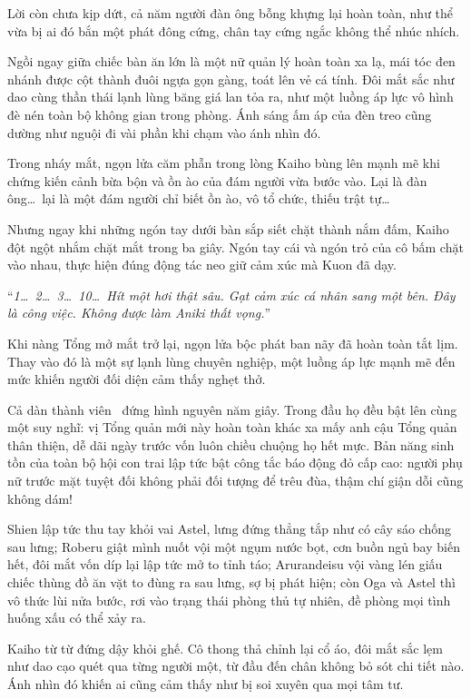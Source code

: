\documentclass[../main.tex]{subfiles}
\begin{document}
Lời còn chưa kịp dứt, cả năm người đàn ông bỗng khựng lại hoàn toàn, như thể vừa bị ai đó bắn một phát đông cứng, chân tay cứng ngắc không thể nhúc nhích.

Ngồi ngay giữa chiếc bàn ăn lớn là một nữ quản lý hoàn toàn xa lạ, mái tóc đen nhánh được cột thành đuôi ngựa gọn gàng, toát lên vẻ cá tính. Đôi mắt sắc như dao cùng thần thái lạnh lùng băng giá lan tỏa ra, như một luồng áp lực vô hình đè nén toàn bộ không gian trong phòng. Ánh sáng ấm áp của đèn treo cũng dường như nguội đi vài phần khi chạm vào ánh nhìn đó.

Trong nháy mắt, ngọn lửa căm phẫn trong lòng Kaiho bùng lên mạnh mẽ khi chứng kiến cảnh bừa bộn và ồn ào của đám người vừa bước vào. Lại là đàn ông\dots\ lại là một đám người chỉ biết ồn ào, vô tổ chức, thiếu trật tự\dots\

Nhưng ngay khi những ngón tay dưới bàn sắp siết chặt thành nắm đấm, Kaiho đột ngột nhắm chặt mắt trong ba giây. Ngón tay cái và ngón trỏ của cô bấm chặt vào nhau, thực hiện đúng động tác neo giữ cảm xúc mà Kuon đã dạy.

``\textit{1\dots\ 2\dots\ 3\dots\ 10\dots\ Hít một hơi thật sâu. Gạt cảm xúc cá nhân sang một bên. Đây là công việc. Không được làm Aniki thất vọng.}''

Khi nàng Tổng mở mắt trở lại, ngọn lửa bộc phát ban nãy đã hoàn toàn tắt lịm. Thay vào đó là một sự lạnh lùng chuyên nghiệp, một luồng áp lực mạnh mẽ đến mức khiến người đối diện cảm thấy nghẹt thở.

Cả dàn thành viên \hls\ đứng hình nguyên năm giây. Trong đầu họ đều bật lên cùng một suy nghĩ: vị Tổng quản mới này hoàn toàn khác xa mấy anh cậu Tổng quản thân thiện, dễ dãi ngày trước vốn luôn chiều chuộng họ hết mực. Bản năng sinh tồn của toàn bộ hội con trai lập tức bật công tắc báo động đỏ cấp cao: người phụ nữ trước mặt tuyệt đối không phải đối tượng để trêu đùa, thậm chí giận dỗi cũng không dám!

Shien lập tức thu tay khỏi vai Astel, lưng đứng thẳng tắp như có cây sáo chống sau lưng; Roberu giật mình nuốt vội một ngụm nước bọt, cơn buồn ngủ bay biến hết, đôi mắt vốn díp lại lập tức mở to tỉnh táo; Arurandeisu vội vàng lén giấu chiếc thùng đồ ăn vặt to đùng ra sau lưng, sợ bị phát hiện; còn Oga và Astel thì vô thức lùi nửa bước, rơi vào trạng thái phòng thủ tự nhiên, đề phòng mọi tình huống xấu có thể xảy ra.

Kaiho từ từ đứng dậy khỏi ghế. Cô thong thả chỉnh lại cổ áo, đôi mắt sắc lẹm như dao cạo quét qua từng người một, từ đầu đến chân không bỏ sót chi tiết nào. Ánh nhìn đó khiến ai cũng cảm thấy như bị soi xuyên qua mọi tâm tư.
\end{document}
